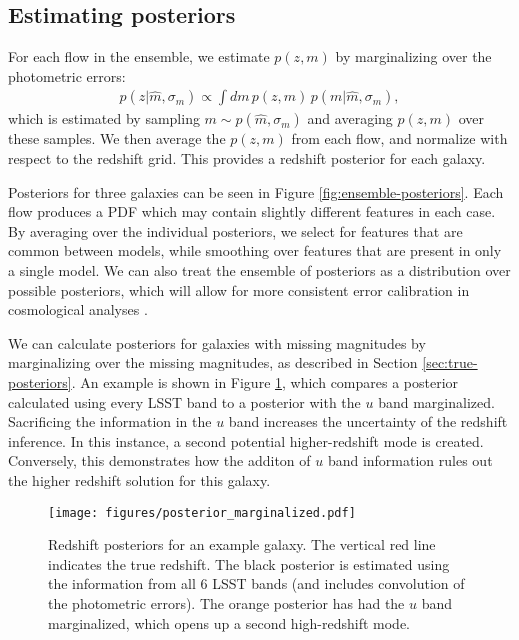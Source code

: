 \documentclass[twocolumn,twocolappendix]{aastex631}
\begin{document}
\subsection{Estimating posteriors}

For each flow in the ensemble, we estimate $p(z, m)$ by marginalizing over the photometric errors:
\begin{align}
    p(z| \hat{m}, \sigma_m) \propto \int dm \, p(z, m) \, p(m| \hat{m}, \sigma_m),
\end{align}
which is estimated by sampling $m \sim p(\hat{m}, \sigma_m)$ and averaging $p(z, m)$ over these samples.
We then average the $p(z, m)$ from each flow, and normalize with respect to the redshift grid.
This provides a redshift posterior for each galaxy.

Posteriors for three galaxies can be seen in Figure \ref{fig:ensemble-posteriors}.
Each flow produces a PDF which may contain slightly different features in each case.
By averaging over the individual posteriors, we select for features that are common between models, while smoothing over features that are present in only a single model.
We can also treat the ensemble of posteriors as a distribution over possible posteriors, which will allow for more consistent error calibration in cosmological analyses \citep{zhang2023}.

We can calculate posteriors for galaxies with missing magnitudes by marginalizing over the missing magnitudes, as described in Section \ref{sec:true-posteriors}.
An example is shown in Figure \ref{fig:posterior_marginalized}, which compares a posterior calculated using every LSST band to a posterior with the $u$ band marginalized.
Sacrificing the information in the $u$ band increases the uncertainty of the redshift inference.
In this instance, a second potential higher-redshift mode is created.
Conversely, this demonstrates how the additon of $u$ band information rules out the higher redshift solution for this galaxy.

\begin{figure}[t]
    \begin{centering}
        \texttt{[image: figures/posterior\_marginalized.pdf]}
        \caption{
            Redshift posteriors for an example galaxy.
            The vertical red line indicates the true redshift.
            The black posterior is estimated using the information from all 6 LSST bands (and includes convolution of the photometric errors).
            The orange posterior has had the $u$ band marginalized, which opens up a second high-redshift mode.
        }
        \label{fig:posterior_marginalized}
    \end{centering}
\end{figure}
\end{document}
